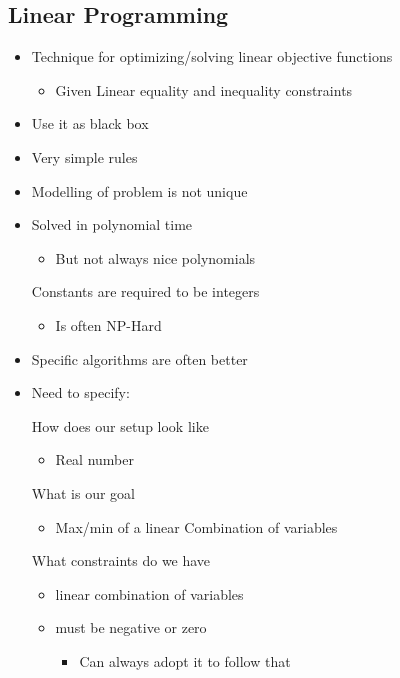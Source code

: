 \subsection{Linear Programming}
\begin{itemize}
    \item Technique for optimizing/solving linear objective functions
        \begin{itemize}
            \item Given Linear equality and inequality constraints
        \end{itemize}
    \item Use it as black box
    \item Very simple rules
    \item Modelling of problem is not unique
    \item Solved in polynomial time
        \begin{itemize}
            \item But not always nice polynomials
        \end{itemize}
     Constants are required to be integers
        \begin{itemize}
            \item Is often NP-Hard
        \end{itemize}
    \item Specific algorithms are often better
    \item Need to specify:
        \begin{itemize}
             How does our setup look like
                \begin{itemize}
                    \item Real number
                \end{itemize}
             What is our goal
                \begin{itemize}
                    \item Max/min of a linear Combination of variables
                \end{itemize}
             What constraints do we have
                \begin{itemize}
                    \item linear combination of variables
                    \item must be negative or zero
                        \begin{itemize}
                            \item Can always adopt it to follow that

\end{itemize}
\end{itemize}
\end{itemize}
\end{itemize}
